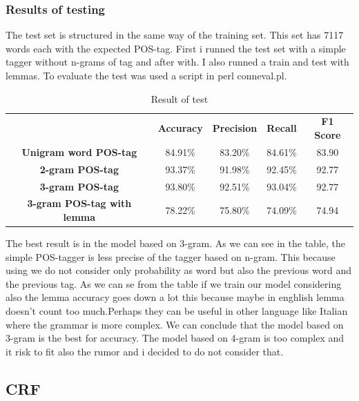 \documentclass[a4paper,8pt,oneside]{article}
\begin{document}
		\subsubsection{Results of testing}
			The test set is structured in the same way of the training set. This set has 7117 words each with the expected POS-tag. First i runned the test set with a simple tagger without n-grams of tag and after with. I also runned a train and test with lemmas. To evaluate the test was used a script in perl conneval.pl.
			\begin{table}[h]
				\begin{tabular}{ccccc}
					& \textbf{Accuracy} & \textbf{Precision} & \textbf{Recall} & \textbf{F1 Score} \\
					\textbf{Unigram word POS-tag} & 84.91\%           & 83.20\%            & 84.61\%         & 83.90 \\
					\textbf{2-gram POS-tag}       & 93.37\%           & 91.98\%            & 92.45\%         & 92.77 \\
					\textbf{3-gram POS-tag}       & 93.80\%           & 92.51\%            & 93.04\%         & 92.77 \\
					\textbf{3-gram POS-tag with lemma}       & 78.22\%           & 75.80\%            & 74.09\%         & 74.94 \\
				\end{tabular}
				\caption{Result of test}
			\end{table}

			The best result is in the model based on 3-gram. As we can see in the table, the simple POS-tagger is less precise of the tagger based on n-gram. This because using we do not consider only probability as word but also the previous word and the previous tag. As we can se from the table if we train our model considering also the lemma accuracy goes down a lot this because maybe in enghlish lemma doesn't count too much.Perhaps they can be useful in other language like Italian where the grammar is more complex. We can conclude that the model based on 3-gram is the best for accuracy. The model based on 4-gram is too complex and it risk to fit also the rumor and i decided to do not consider that.

	\subsection{CRF}
\end{document}
